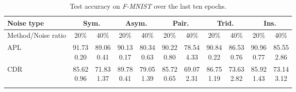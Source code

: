 \documentclass[11pt]{article}
\begin{document}
\begin{table}[!t]
    \small
\centering
	\begin{tabular}{l |cc|cc|cc|cc|cc} 
		\Xhline{3\arrayrulewidth}	 	
		   Noise type &\multicolumn{2}{c|}{Sym.}&\multicolumn{2}{c|}{Asym.}&\multicolumn{2}{c|}{Pair.}&\multicolumn{2}{c|}{Trid.}&\multicolumn{2}{c}{Ins.}\\
			\hline
		   Method/Noise ratio&  20\% & 40\%& 20\% & 40\% &20\% & 40\%& 20\% & 40\% & 20\% & 40\%\\
			\hline
			APL& \makecell{91.73\\ \scriptsize{0.20}} 
			& \makecell{89.06\\ \scriptsize{0.41}}
			& \makecell{90.13\\ \scriptsize{0.17}}
			& \makecell{80.34\\ \scriptsize{0.63}}
			& \makecell{90.22\\ \scriptsize{0.80}}
			& \makecell{78.54\\ \scriptsize{4.33}}
			& \makecell{90.84\\ \scriptsize{0.22}}
			& \makecell{86.53\\ \scriptsize{0.76}}
			& \makecell{90.96\\ \scriptsize{0.77}}
			& \makecell{85.55\\ \scriptsize{2.86}}\\\hline
			CDR & \makecell{85.62\\ \scriptsize{0.96}}
			& \makecell{71.83\\ \scriptsize{1.37}}
			& \makecell{89.78\\ \scriptsize{0.41}}
			& \makecell{79.05\\ \scriptsize{1.39}}
			& \makecell{85.72\\ \scriptsize{0.65}}
			& \makecell{69.07\\ \scriptsize{2.31}}
			& \makecell{86.75\\ \scriptsize{1.19}}
			& \makecell{73.63\\ \scriptsize{2.82}}
			& \makecell{85.92\\ \scriptsize{1.43}}
			& \makecell{73.14\\ \scriptsize{3.12}}\\
			\hline
		\Xhline{3\arrayrulewidth}
\end{tabular}
\caption
		{
Test accuracy on \textit{F-MNIST} over the last ten epochs. 
		}
	\label{tab:com_fmnist}
\end{table}		
\end{document}
